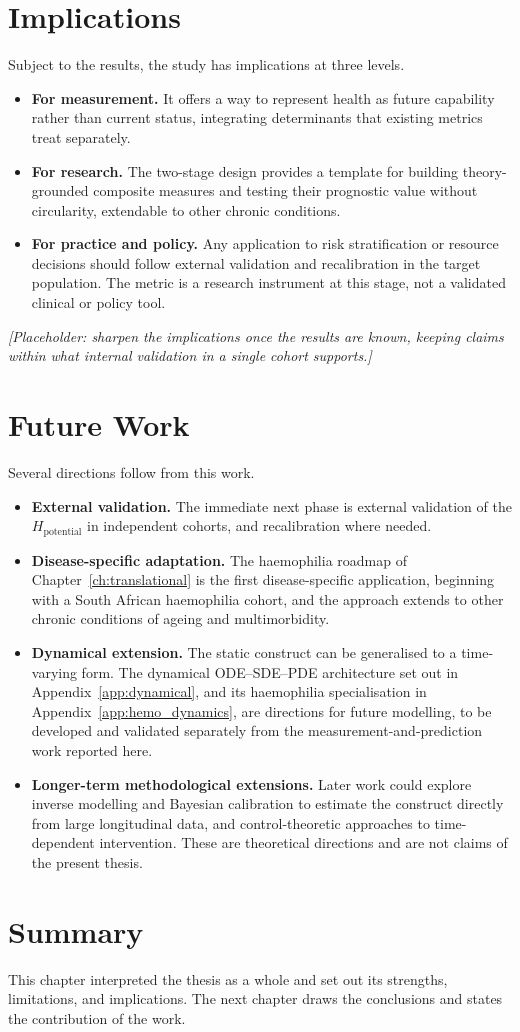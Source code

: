 \section{Implications}
\noindent Subject to the results, the study has implications at three levels.
\begin{itemize}
  \item \textbf{For measurement.} It offers a way to represent health as future capability rather than current status, integrating determinants that existing metrics treat separately.
  \item \textbf{For research.} The two-stage design provides a template for building theory-grounded composite measures and testing their prognostic value without circularity, extendable to other chronic conditions.
  \item \textbf{For practice and policy.} Any application to risk stratification or resource decisions should follow external validation and recalibration in the target population. The metric is a research instrument at this stage, not a validated clinical or policy tool.
\end{itemize}

\medskip
\noindent\emph{[Placeholder: sharpen the implications once the results are known, keeping claims within what internal validation in a single cohort supports.]}

\section{Future Work}
\noindent Several directions follow from this work.
\begin{itemize}
  \item \textbf{External validation.} The immediate next phase is external validation of the $H_{\text{potential}}$ in independent cohorts, and recalibration where needed.
  \item \textbf{Disease-specific adaptation.} The haemophilia roadmap of Chapter~\ref{ch:translational} is the first disease-specific application, beginning with a South African haemophilia cohort, and the approach extends to other chronic conditions of ageing and multimorbidity.
  \item \textbf{Dynamical extension.} The static construct can be generalised to a time-varying form. The dynamical ODE--SDE--PDE architecture set out in Appendix~\ref{app:dynamical}, and its haemophilia specialisation in Appendix~\ref{app:hemo_dynamics}, are directions for future modelling, to be developed and validated separately from the measurement-and-prediction work reported here.
  \item \textbf{Longer-term methodological extensions.} Later work could explore inverse modelling and Bayesian calibration to estimate the construct directly from large longitudinal data, and control-theoretic approaches to time-dependent intervention. These are theoretical directions and are not claims of the present thesis.
\end{itemize}

\section{Summary}
\noindent This chapter interpreted the thesis as a whole and set out its strengths, limitations, and implications. The next chapter draws the conclusions and states the contribution of the work.

\fi
